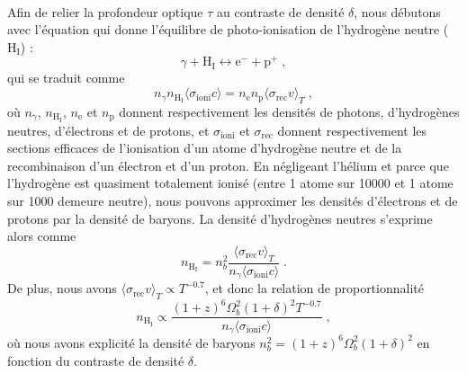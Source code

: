 \paragraph{}
Afin de relier la profondeur optique $\tau$ au contraste de densité $\delta$, nous débutons avec l'équation qui donne l'équilibre de photo-ionisation de l'hydrogène neutre ($\mathrm{H}_{\mathrm{I}}$) :
\begin{equation}
  \gamma + \mathrm{H}_{\mathrm{I}} \leftrightarrow \mathrm{e}^{-} + \mathrm{p}^{+} \; ,
\end{equation}
qui se traduit comme
\begin{equation}
  n_{\gamma} n_{\mathrm{H}_{\mathrm{I}}} \langle \sigma_{\mathrm{ioni}} c \rangle
  = n_{\mathrm{e}} n_{\mathrm{p}} \langle \sigma_{\mathrm{rec}} v \rangle_{T} \; ,
\end{equation}
où $n_{\gamma}$, $n_{\mathrm{H}_{\mathrm{I}}}$, $n_{\mathrm{e}}$ et $n_{\mathrm{p}}$ donnent respectivement les densités de photons, d'hydrogènes neutres, d'électrons et de protons, 
et $ \sigma_{\mathrm{ioni}}$ et $\sigma_{\mathrm{rec}}$ donnent respectivement les sections efficaces de l'ionisation d'un atome d'hydrogène neutre et de la recombinaison d'un électron et d'un proton.
En négligeant l'hélium et parce que l'hydrogène est quasiment totalement ionisé (entre 1 atome sur \num{10000} et 1 atome sur \num{1000} demeure neutre), nous pouvons approximer les densités d'électrons et de protons par la densité de baryons. La densité d'hydrogènes neutres s'exprime alors comme
\begin{equation}
  n_{\mathrm{H}_{\mathrm{I}}}
  = n_{b}^2 \frac{\langle \sigma_{\mathrm{rec}} v \rangle_{T}}{n_{\gamma} \langle \sigma_{\mathrm{ioni}} c \rangle } \; .
\end{equation}
De plus, nous avons $\langle \sigma_{\mathrm{rec}} v \rangle_{T} \propto T^{-\num{0.7}}$, et donc la relation de proportionnalité
\begin{equation}
  n_{\mathrm{H}_{\mathrm{I}}} \propto \frac{(1+z)^6 \Omega_b^2 (1+\delta)^2 T^{-\num{0.7}}}{n_{\gamma} \langle \sigma_{\mathrm{ioni}} c \rangle} \; ,
\end{equation}
où nous avons explicité la densité de baryons $n_{b}^2 = (1+z)^6 \Omega_b^2 (1+\delta)^2$ en fonction du contraste de densité $\delta$.
